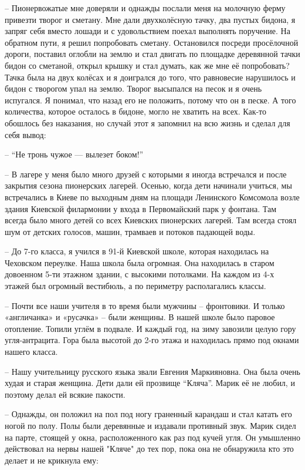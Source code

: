 – Пионервожатые мне доверяли и однажды послали меня на молочную ферму привезти
творог и сметану. Мне дали двухколёсную тачку, два пустых бидона, я запряг себя
вместо лошади и с удовольствием поехал выполнять поручение. На обратном пути, я
решил попробовать сметану. Остановился посреди просёлочной дороги, поставил
оглобли на землю и стал двигать по площадке деревянной тачки бидон со сметаной,
открыл крышку и стал думать, как же мне её попробовать? Тачка была на двух
колёсах и я доигрался  до того, что равновесие нарушилось и бидон с творогом
упал на землю. Творог высыпался на песок и я очень испугался. Я понимал, что
назад его не положить, потому что он в песке. А того количества, которое
осталось в бидоне, могло не хватить на всех. Как-то обошлось без наказания, но
случай этот я запомнил на всю жизнь и сделал для себя вывод:

– “Не тронь чужое — вылезет боком!” 

– В лагере у меня было много друзей с которыми я иногда встречался и после
закрытия сезона пионерских лагерей. Осенью, когда дети начинали учиться, мы
встречались в Киеве по выходным дням на площади Ленинского Комсомола возле
здания Киевской филармонии у входа в Первомайский парк у фонтана. Там всегда
было много детей со всех Киевских пионерских лагерей. Там всегда стоял шум от
детских голосов, машин, трамваев и потоков падающей воды.

– До 7-го класса, я учился в 91-й Киевской школе, которая находилась на
Чеховском переулке. Наша школа была огромная. Она находилась в старом довоенном
5-ти этажном здании, с высокими потолками. На каждом из 4-х этажей был огромный
вестибюль, а по периметру располагались классы.

– Почти все наши учителя в то время были мужчины – фронтовики. И только
«англичанка» и «русачка» – были женщины. В нашей школе было паровое отопление.
Топили углём в подвале. И каждый год, на зиму завозили целую гору
угля-антрацита. Гора была высотой до 2-го этажа и находилась прямо под окнами
нашего класса.

– Нашу учительницу русского языка звали Евгения Маркияновна. Она была очень
худая и старая женщина. Дети дали ей прозвище “Кляча”. Марик её не любил, и
поэтому делал ей всякие пакости.

– Однажды, он положил на пол под ногу граненный карандаш и стал катать его
ногой по полу. Полы были деревянные и издавали противный звук. Марик сидел на
парте, стоящей у окна, расположенного как раз под кучей угля. Он умышленно
действовал на нервы нашей "Кляче" до тех пор, пока она не обнаружила кто это
делает и не крикнула ему:


